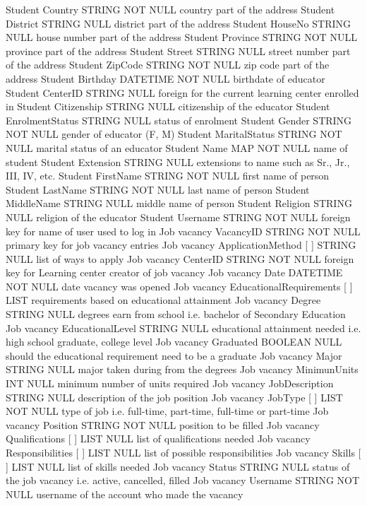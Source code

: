 Student		Country	STRING	NOT NULL	country part of the address
Student		District	STRING	NULL	district part of the address
Student		HouseNo	STRING	NULL	house number part of the address
Student		Province	STRING	NOT NULL	province part of the address
Student		Street	STRING	NULL	street number part of the address
Student		ZipCode	STRING	NOT NULL	zip code part of the address
Student	Birthday	DATETIME	NOT NULL	birthdate of educator
Student	CenterID	STRING	NULL	foreign for the current learning center enrolled in
Student	Citizenship	STRING	NULL	citizenship of the educator
Student	EnrolmentStatus	STRING	NULL	status of enrolment
Student	Gender	STRING	NOT NULL	gender of educator (F, M)
Student	MaritalStatus	STRING	NOT NULL	marital status of an educator
Student	Name { }	MAP	NOT NULL	name of student
Student	 	Extension	STRING	NULL	extensions to name such as Sr., Jr., III, IV, etc.
Student		FirstName	STRING	NOT NULL	first name of person
Student		LastName	STRING	NOT NULL	last name of person
Student		MiddleName	STRING	NULL	middle name of person
Student	Religion	STRING	NULL	religion of the educator
Student	Username	STRING	NOT NULL	foreign key for name of user used to log in
Job vacancy	VacancyID	STRING	NOT NULL	primary key for job vacancy entries
Job vacancy	ApplicationMethod [ ]	STRING	NULL	list of ways to apply
Job vacancy	CenterID	STRING	NOT NULL	foreign key for Learning center creator of job vacancy
Job vacancy	Date	DATETIME	NOT NULL	date vacancy was opened
Job vacancy	EducationalRequirements [ ] { }	LIST	 	requirements based on educational attainment
Job vacancy	 	Degree	STRING	NULL	degrees earn from school i.e. bachelor of Secondary Education
Job vacancy		EducationalLevel	STRING	NULL	educational attainment needed i.e. high school graduate, college level
Job vacancy		Graduated	BOOLEAN	NULL	should the educational requirement need to be a graduate
Job vacancy		Major	STRING	NULL	major taken during from the degrees
Job vacancy		MinimunUnits	INT	NULL	minimum number of units required
Job vacancy	JobDescription	STRING	NULL	description of the job position
Job vacancy	JobType [ ]	LIST	NOT NULL	type of job i.e. full-time, part-time, full-time or part-time
Job vacancy	Position	STRING	NOT NULL	position to be filled
Job vacancy	Qualifications [ ]	LIST	NULL	list of qualifications needed
Job vacancy	Responsibilities [ ]	LIST	NULL	list of possible responsibilities
Job vacancy	Skills [ ]	LIST	NULL	list of skills needed
Job vacancy	Status	STRING	NULL	status of the job vacancy i.e. active, cancelled, filled
Job vacancy	Username	STRING	NOT NULL	username of the account who made the vacancy
